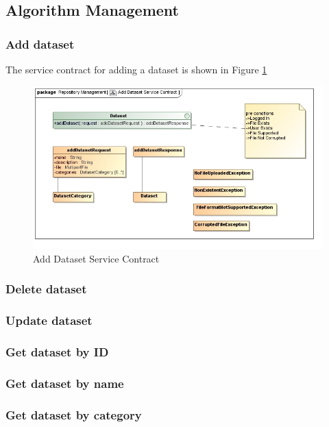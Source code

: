 \subsection{Algorithm Management}

\subsubsection {Add dataset}
The service contract for adding a dataset is shown in Figure \ref{fig:addDatasetService}
\begin{figure}[H]
  \begin{center}
  \includegraphics[scale=0.6]{../Diagrams and Charts/Test Data/Add Dataset Service Contract.jpg}
  \caption{Add Dataset Service Contract}
  \label{fig:addDatasetService}
  \end{center}
  
\end{figure}

\subsubsection {Delete dataset}
\subsubsection {Update dataset}
\subsubsection {Get dataset by ID}
\subsubsection {Get dataset by name}
\subsubsection {Get dataset by category}
